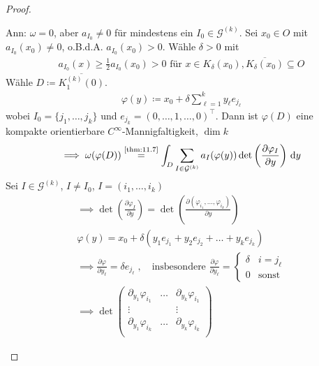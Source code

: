 \begin{theorem}[Satz]
  \begin{proof}
    \begin{enum-arab}
      \item Ann: $\omega = 0$, aber $a_{I_0} \neq 0$ für mindestens ein $I_0 \in \mathcal{G}^{(k)}$. Sei $x_0 \in O$ mit $a_{I_0} (x_0) \neq 0$, o.B.d.A. $a_{I_0}(x_0) > 0$. Wähle $\delta > 0$ mit
      \begin{align*}
        a_{I_0} (x) \geq \frac{1}{2} a_{I_0}(x_0) > 0 \text{ für } x \in K_\delta(x_0), \overline{K_\delta(x_0)} \subseteq O
      \end{align*}
      Wähle $D \coloneq \overline{K_1^{(k)}(0)}$.
      \begin{align*}
        \varphi(y) \coloneq x_0 + \delta \sum\limits_{\ell=1}^{k} y_\ell e_{j_\ell}
      \end{align*}
      wobei $I_0 = \{ j_1,\ldots,j_k \}$ und $e_{j_k} = (0,\ldots,1,\ldots,0)^\top$. Dann ist $\varphi(D)$ eine kompakte orientierbare $C^\infty$-Mannigfaltigkeit, $\dim k$
      \begin{align*}
        \implies \omega(\varphi(D)) \overset{\text{\ref{thm:11.7}}}{=} \int_D \sum\limits_{I \in \mathcal{G}^{(k)}} a_I(\varphi(y)) \det\left( \frac{\partial \varphi_I}{\partial y} \right) \, \mathrm{d}y
      \end{align*}
      Sei $I \in \mathcal{G}^{(k)}$, $I \neq I_0$, $I = (i_1,\ldots,i_k)$
      \begin{gather*}
        \implies \det\left( \frac{\partial \varphi_I}{\partial y} \right) = \det\left( \frac{\partial (\varphi_{i_1} ,\ldots,\varphi_{i_k})}{\partial y} \right) \\
        \varphi(y) = x_0 + \delta(y_1 e_{j_1} + y_2 e_{j_2} + \ldots + y_k e_{j_k}) \\
        \implies \frac{\partial \varphi}{\partial y_\ell} = \delta e_{j_\ell} \; , \quad \text{insbesondere }
        \frac{\partial \varphi}{\partial y_\ell} =
        \begin{cases}
          \delta & i = j_\ell \\
          0 & \text{sonst}
        \end{cases} \\
        \implies \det
        \begin{pmatrix}
          \partial_{y_1} \varphi_{i_1} & \ldots & \partial_{y_k} \varphi_{i_1} \\
          \vdots & & \vdots \\
          \partial_{y_1} \varphi_{i_k} & \ldots & \partial_{y_k} \varphi_{i_k} \\

\end{pmatrix}
\end{gather*}
\end{enum-arab}
\end{proof}
\end{theorem}
